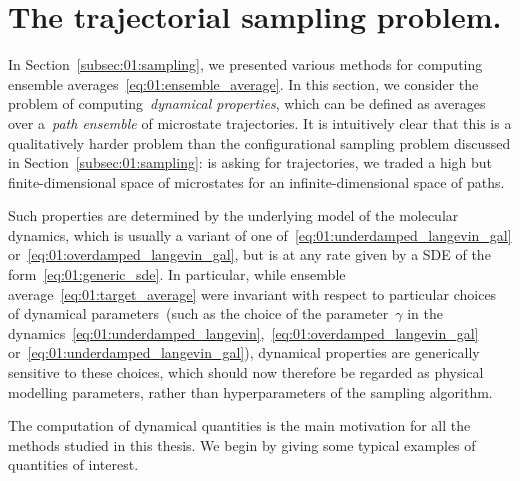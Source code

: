 
\section{The trajectorial sampling problem.}
\label{sec:01:dynamical_properties}
In Section~\ref{subsec:01:sampling}, we presented various methods for computing ensemble averages~\eqref{eq:01:ensemble_average}.
In this section, we consider the problem of computing~\textit{dynamical properties}, which can be defined as averages over a~\textit{path ensemble} of microstate trajectories.
It is intuitively clear that this is a qualitatively harder problem than the configurational sampling problem discussed in Section~\ref{subsec:01:sampling}: is asking for trajectories, we traded a high but finite-dimensional space of microstates for an infinite-dimensional space of paths.

Such properties are determined by the underlying model of the molecular dynamics, which is usually a variant of one of~\eqref{eq:01:underdamped_langevin_gal} or~\eqref{eq:01:overdamped_langevin_gal}, but is at any rate given by a SDE of the form~\eqref{eq:01:generic_sde}.
In particular, while ensemble average~\eqref{eq:01:target_average} were invariant with respect to particular choices of dynamical parameters~(such as the choice of the parameter~$\gamma$ in the dynamics~\eqref{eq:01:underdamped_langevin},~\eqref{eq:01:overdamped_langevin_gal} or~\eqref{eq:01:underdamped_langevin_gal}), dynamical properties are generically sensitive to these choices, which should now therefore be regarded as physical modelling parameters, rather than hyperparameters of the sampling algorithm.

The computation of dynamical quantities is the main motivation for all the methods studied in this thesis. We begin by giving some typical examples of quantities of interest.

